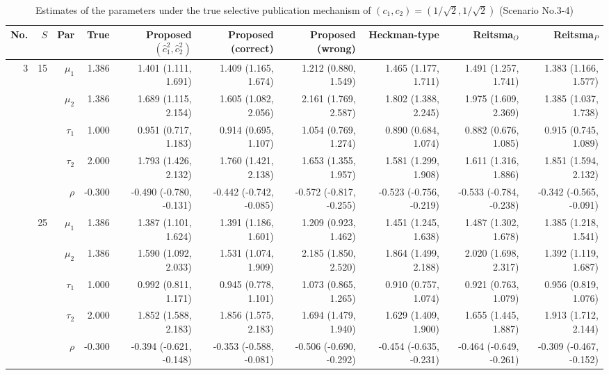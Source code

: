 \documentclass[
]{article}
\begin{document}
\begin{table}

\caption{\label{tab:c11-par2}Estimates of the parameters under the true selective publication mechanism of $(c_1, c_2) = (1/\sqrt{2}, 1/\sqrt{2})$ (Scenario No.3-4)}
\centering
\begin{tabular}[t]{rrrrrrrrrr}
\toprule
No. & $S$ & Par & True & Proposed $(\hat{c}_1^2, \hat{c}_2^2)$ & Proposed (correct) & Proposed (wrong) & Heckman-type & Reitsma$_O$ & Reitsma$_P$\\
\midrule
3 & 15 & $\mu_1$ & 1.386 & 1.401 (1.111, 1.691) & 1.409 (1.165, 1.674) & 1.212 (0.880, 1.549) & 1.465 (1.177, 1.711) & 1.491 (1.257, 1.741) & 1.383 (1.166, 1.577)\\
 &  & $\mu_2$ & 1.386 & 1.689 (1.115, 2.154) & 1.605 (1.082, 2.056) & 2.161 (1.769, 2.587) & 1.802 (1.388, 2.245) & 1.975 (1.609, 2.369) & 1.385 (1.037, 1.738)\\
 &  & $\tau_1$ & 1.000 & 0.951 (0.717, 1.183) & 0.914 (0.695, 1.107) & 1.054 (0.769, 1.274) & 0.890 (0.684, 1.074) & 0.882 (0.676, 1.085) & 0.915 (0.745, 1.089)\\
 &  & $\tau_2$ & 2.000 & 1.793 (1.426, 2.132) & 1.760 (1.421, 2.138) & 1.653 (1.355, 1.957) & 1.581 (1.299, 1.908) & 1.611 (1.316, 1.886) & 1.851 (1.594, 2.132)\\
 &  & $\rho$ & -0.300 & -0.490 (-0.780, -0.131) & -0.442 (-0.742, -0.085) & -0.572 (-0.817, -0.255) & -0.523 (-0.756, -0.219) & -0.533 (-0.784, -0.238) & -0.342 (-0.565, -0.091)\\
\addlinespace
 & 25 & $\mu_1$ & 1.386 & 1.387 (1.101, 1.624) & 1.391 (1.186, 1.601) & 1.209 (0.923, 1.462) & 1.451 (1.245, 1.638) & 1.487 (1.302, 1.678) & 1.385 (1.218, 1.541)\\
 &  & $\mu_2$ & 1.386 & 1.590 (1.092, 2.033) & 1.531 (1.074, 1.909) & 2.185 (1.850, 2.520) & 1.864 (1.499, 2.188) & 2.020 (1.698, 2.317) & 1.392 (1.119, 1.687)\\
 &  & $\tau_1$ & 1.000 & 0.992 (0.811, 1.171) & 0.945 (0.778, 1.101) & 1.073 (0.865, 1.265) & 0.910 (0.757, 1.074) & 0.921 (0.763, 1.079) & 0.956 (0.819, 1.076)\\
 &  & $\tau_2$ & 2.000 & 1.852 (1.588, 2.183) & 1.856 (1.575, 2.183) & 1.694 (1.479, 1.940) & 1.629 (1.409, 1.900) & 1.655 (1.445, 1.887) & 1.913 (1.712, 2.144)\\
 &  & $\rho$ & -0.300 & -0.394 (-0.621, -0.148) & -0.353 (-0.588, -0.081) & -0.506 (-0.690, -0.292) & -0.454 (-0.635, -0.231) & -0.464 (-0.649, -0.261) & -0.309 (-0.467, -0.152)\\

\end{tabular}
\end{table}
\end{document}
